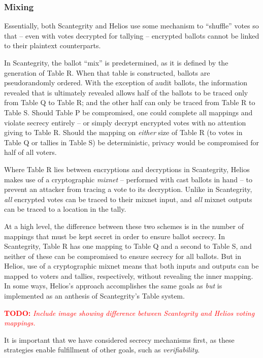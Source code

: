 \documentclass[10pt]{article}
\newcommand{\todo}[1]{\textcolor{red}{\textbf{TODO:} \emph{#1}}}
\newcommand{\term}[1]{\textit{#1}}
\begin{document}
\begin{multicols}{2}
\subsubsection{Mixing}

Essentially, both Scantegrity and Helios use some mechanism to ``shuffle'' votes so that -- even
with votes decrypted for tallying -- encrypted ballots cannot be linked to their plaintext
counterparts.

In Scantegrity, the ballot ``mix'' is predetermined, as it is defined by the generation of Table R.
When that table is constructed, ballots are pseudorandomly ordered. With the exception of audit
ballots, the information revealed that is ultimately revealed allows half of the ballots to be
traced only from Table Q to Table R; and the other half can only be traced from Table R to Table S.
Should Table P be compromised, one could complete all mappings and violate secrecy entirely -- or
simply decrypt encrypted votes with no attention giving to Table R. Should the mapping on
\emph{either} size of Table R (to votes in Table Q or tallies in Table S) be deterministic, privacy
would be compromised for half of all voters.

Where Table R lies between encryptions and decryptions in Scantegrity, Helios makes use of a
cryptographic \term{mixnet} -- performed with cast ballots in hand -- to prevent an attacker from
tracing a vote to its decryption. Unlike in Scantegrity, \emph{all} encrypted votes can be traced to
their mixnet input, and \emph{all} mixnet outputs can be traced to a location in the tally.

At a high level, the difference between these two schemes is in the number of mappings that must be
kept secret in order to ensure ballot secrecy. In Scantegrity, Table R has one mapping to Table Q
and a second to Table S, and neither of these can be compromised to ensure secrecy for all ballots.
But in Helios, use of a cryptographic mixnet means that both inputs and outputs can be mapped to
voters and tallies, respectively, without revealing the inner mapping. In some ways, Helios's
approach accomplishes the same goals as \emph{but} is implemented as an anthesis of Scantegrity's
Table system.

\todo{Include image showing difference between Scantegrity and Helios voting mappings.}

It is important that we have considered secrecy mechanisms first, as these strategies enable
fulfillment of other goals, such as \emph{verifiability}.


\end{multicols}
\end{document}
